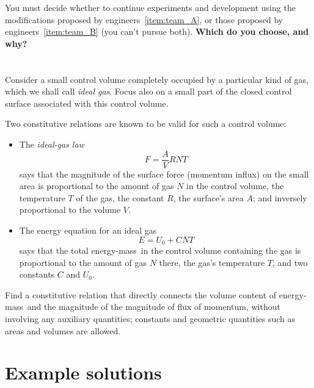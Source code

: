 \documentclass[a4paper,12pt,%
onecolumn,oneside,%
british%
]{memoir}
\newcommand{\addsec}[1]{\section*{#1}\addcontentsline{toc}{section}{#1}}
\renewcommand*{\|}[1][]{\nonscript\:#1\vert\nonscript\:\mathopen{}}
\newcommand*{\energym}{energy-mass}
\newcommand*{\yN}{N}
\newcommand*{\yE}{E}
\newcommand*{\yU}{U}
\newcommand*{\yT}{T}%
\begin{document}
You must decide whether to continue experiments and development using the modifications proposed by engineers~\ref{item:team_A}, or those proposed by engineers~\ref{item:team_B} (you can't pursue both). \textbf{Which do you choose, and why?}


\section{}
\label{sec:ideal_gas_const}
Consider a small control volume completely occupied by a particular kind of gas, which we shall call \emph{ideal gas}. Focus also on a small part of the closed control surface associated with this control volume.

Two constitutive relations are known to be valid for such a control volume:
\begin{itemize}
\item The \emph{ideal-gas law}
  \begin{equation*}
    F = \frac{A}{V} R \yN \yT
  \end{equation*}
says that the magnitude of the surface force (momentum influx) on the small area is proportional to the amount of gas $\yN$ in the control volume, the temperature $\yT$ of the gas, the constant $R$, the surface's area $A$; and inversely proportional to the volume $V$.

\item The energy equation for an ideal gas
  \begin{equation*}
    \yE = \yU_{0} + C \yN \yT
  \end{equation*}
  says that the total \energym\ in the control volume containing the gas is proportional to the amount of gas $\yN$ there, the gas's temperature $\yT$, and two constants $C$ and $\yU_{0}$.
\end{itemize}

Find a constitutive relation that directly connects the volume content of \energym\ and the magnitude of the magnitude of flux of momentum, without involving any auxiliary quantities; constants and geometric quantities such as areas and volumes are allowed.




\clearpage
\addsec{Example solutions}
\end{document}
